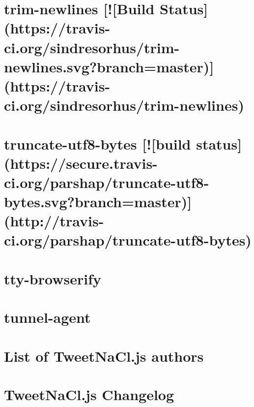 \documentclass[twoside]{book}
\newcommand{\+}{\discretionary{\mbox{\scriptsize$\hookleftarrow$}}{}{}}
\begin{document}
\chapter{trim-\/newlines \mbox{[}!\mbox{[}Build Status\mbox{]}(https\+://travis-\/ci.org/sindresorhus/trim-\/newlines.svg?branch=master)\mbox{]}(https\+://travis-\/ci.org/sindresorhus/trim-\/newlines)}
\label{md_dsmacc_examples_DRmerge_node_modules_trim-newlines_readme}

\chapter{truncate-\/utf8-\/bytes \mbox{[}!\mbox{[}build status\mbox{]}(https\+://secure.travis-\/ci.org/parshap/truncate-\/utf8-\/bytes.svg?branch=master)\mbox{]}(http\+://travis-\/ci.org/parshap/truncate-\/utf8-\/bytes)}
\label{md_dsmacc_examples_DRmerge_node_modules_truncate-utf8-bytes_README}

\chapter{tty-\/browserify}
\label{md_dsmacc_examples_DRmerge_node_modules_tty-browserify_readme}

\chapter{tunnel-\/agent}
\label{md_dsmacc_examples_DRmerge_node_modules_tunnel-agent_README}

\chapter{List of Tweet\+Na\+Cl.\+js authors}
\label{md_dsmacc_examples_DRmerge_node_modules_tweetnacl_AUTHORS}

\chapter{Tweet\+Na\+Cl.\+js Changelog}
\label{md_dsmacc_examples_DRmerge_node_modules_tweetnacl_CHANGELOG}

\end{document}
